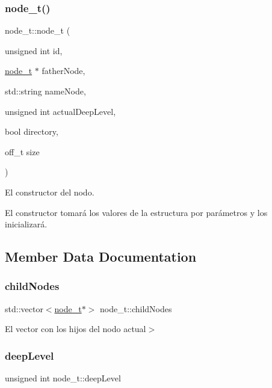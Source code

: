 \subsubsection{\texorpdfstring{node\+\_\+t()}{node\_t()}}
{\footnotesize\ttfamily node\+\_\+t\+::node\+\_\+t (\begin{DoxyParamCaption}\item[{unsigned int}]{id,  }\item[{\hyperlink{structnode__t}{node\+\_\+t} $\ast$}]{father\+Node,  }\item[{std\+::string}]{name\+Node,  }\item[{unsigned int}]{actual\+Deep\+Level,  }\item[{bool}]{directory,  }\item[{off\+\_\+t}]{size }\end{DoxyParamCaption})\hspace{0.3cm}{\ttfamily [inline]}}



El constructor del nodo. 

El constructor tomará los valores de la estructura por parámetros y los inicializará. 

\subsection{Member Data Documentation}
\mbox{\label{structnode__t_a7087dffd0a04067c1a713e9c35df15cc}} 
\subsubsection{\texorpdfstring{child\+Nodes}{childNodes}}
{\footnotesize\ttfamily std\+::vector$<$\hyperlink{structnode__t}{node\+\_\+t}$\ast$$>$ node\+\_\+t\+::child\+Nodes}

El vector con los hijos del nodo actual$>$ \mbox{\label{structnode__t_ae2fe752b52c2d4782ebbb6a9a5f28d49}} 
\subsubsection{\texorpdfstring{deep\+Level}{deepLevel}}
{\footnotesize\ttfamily unsigned int node\+\_\+t\+::deep\+Level}

